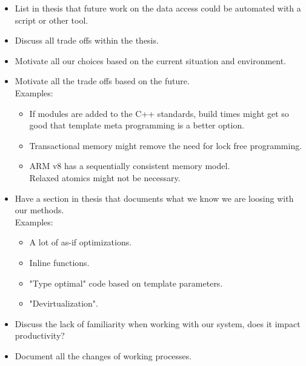\documentclass{article}
\begin{document}
\begin{itemize}
    \item
    List in thesis that future work on the data access could be automated with a script or other tool.
    
    \item
    Discuss all trade offs within the thesis.

    \item
    Motivate all our choices based on the current situation and environment.

    \item 
    Motivate all the trade offs based on the future.\\
    Examples:
    \begin{itemize}
        \item
        If modules are added to the C++ standards, build times might get so good that template meta programming is a better option.

        \item
        Transactional memory might remove the need for lock free programming.

        \item
        ARM v8 has a sequentially consistent memory model.\\
        Relaxed atomics might not be necessary.
    \end{itemize}

    \item
    Have a section in thesis that documents what we know we are loosing with our methods.\\
    Examples:
    \begin{itemize}
        \item
        A lot of as-if optimizations.

        \item
        Inline functions. 
        
        \item
        "Type optimal" code based on template parameters.

        \item
        "Devirtualization".
    \end{itemize}

    \item
    Discuss the lack of familiarity when working with our system, does it impact productivity?

    \item
    Document all the changes of working processes.
\end{itemize}
\end{document}
